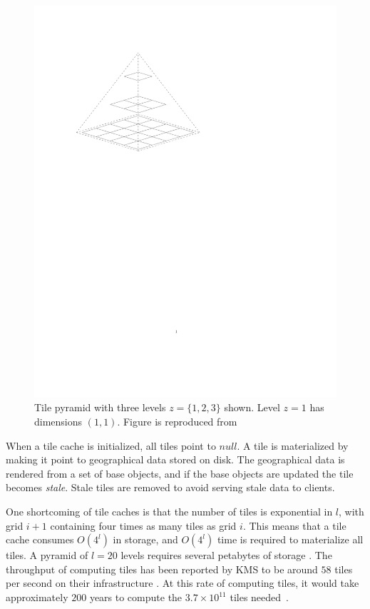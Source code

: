 \documentclass[11pt, oneside]{report}
\begin{document}
\begin{figure}
\centering
\includegraphics[scale=0.8]{figs-tileheat/tilepyramid}
\caption{Tile pyramid with three levels $z=\{1, 2, 3\}$ shown. Level $z=1$ has dimensions $(1,1)$. Figure is reproduced from \cite{quinn10}}
\label{fig:tilepyramid}
\end{figure}

When a tile cache is initialized, all tiles point to $null$. A tile is materialized by making it point to geographical data stored on disk. The geographical data is rendered from a set of base objects, and if the base objects are updated the tile becomes \emph{stale}. Stale tiles are removed to avoid serving stale data to clients.

One shortcoming of tile caches is that the number of tiles is exponential in $l$, with grid $i+1$ containing four times as many tiles as grid $i$. This means that a tile cache consumes $O(4^l)$ in storage, and $O(4^l)$ time is required to materialize all tiles. A pyramid of $l=20$ levels requires several petabytes of storage \cite{garcia11}. The throughput of computing tiles has been reported by KMS to be around $58$ tiles per second on their infrastructure \cite{lindegaard12}. At this rate of computing tiles, it would take approximately $200$ years to compute the $3.7 \times 10^{11}$ tiles needed~\cite{garcia11}.
\end{document}
